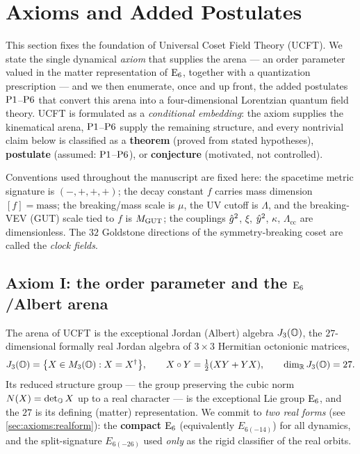 \section{Axioms and Added Postulates}
\label{sec:axioms:main}

This section fixes the foundation of Universal Coset Field Theory (UCFT).
We state the single dynamical \emph{axiom} that supplies the arena --- an
order parameter valued in the matter representation of $\mathrm{E}_{6}$, together
with a quantization prescription --- and we then enumerate, once and up
front, the added postulates $\textnormal{P1}$--$\textnormal{P6}$ that convert this arena into a
four-dimensional Lorentzian quantum field theory. UCFT is formulated as a
\emph{conditional embedding}: the axiom supplies the kinematical arena,
$\textnormal{P1}$--$\textnormal{P6}$ supply the remaining structure, and every nontrivial claim
below is classified as a \textbf{theorem} (proved from stated hypotheses),
\textbf{postulate} (assumed: $\textnormal{P1}$--$\textnormal{P6}$), or
\textbf{conjecture} (motivated, not controlled).

Conventions used throughout the manuscript are fixed here: the spacetime
metric signature is $(-,+,+,+)$; the decay constant $f$ carries mass
dimension $[f]=\text{mass}$; the breaking/mass scale is $\mu$, the UV cutoff
is $\Lambda$, and the breaking-VEV (GUT) scale tied to $f$ is $M_{\mathrm{GUT}}$; the
couplings $\hat g^2$, $\xi$, $\hat y^2$, $\kappa$, $\Lambda_{\mathrm{cc}}$ are
dimensionless. The $32$ Goldstone directions of the symmetry-breaking coset
are called the \emph{clock fields}.

\subsection{Axiom I: the order parameter and the \texorpdfstring{$\mathrm{E}_{6}$}{E6}/Albert arena}
\label{sec:axioms:axiomI}

The arena of UCFT is the exceptional Jordan (Albert) algebra
$J_3(\mathbb{O})$, the $27$-dimensional formally real Jordan algebra of
$3\times3$ Hermitian octonionic matrices,
\[
  J_3(\mathbb{O})=\bigl\{X\in M_3(\mathbb{O}): X=X^{\dagger}\bigr\},
  \qquad X\circ Y=\tfrac12(XY+YX),
  \qquad \dim_{\mathbb R}J_3(\mathbb{O})=27 .
\]
Its reduced structure group --- the group preserving the cubic norm
$N(X)=\det_{\mathbb{O}}X$ up to a real character --- is the exceptional Lie group
$\mathrm{E}_{6}$, and the $27$ is its defining (matter) representation. We commit to
\emph{two real forms} (see \autoref{sec:axioms:realform}): the
\textbf{compact} $\mathrm{E}_{6}$ (equivalently $E_{6(-14)}$) for all dynamics, and
the split-signature $E_{6(-26)}$ used \emph{only} as the rigid classifier of
the real orbits.

